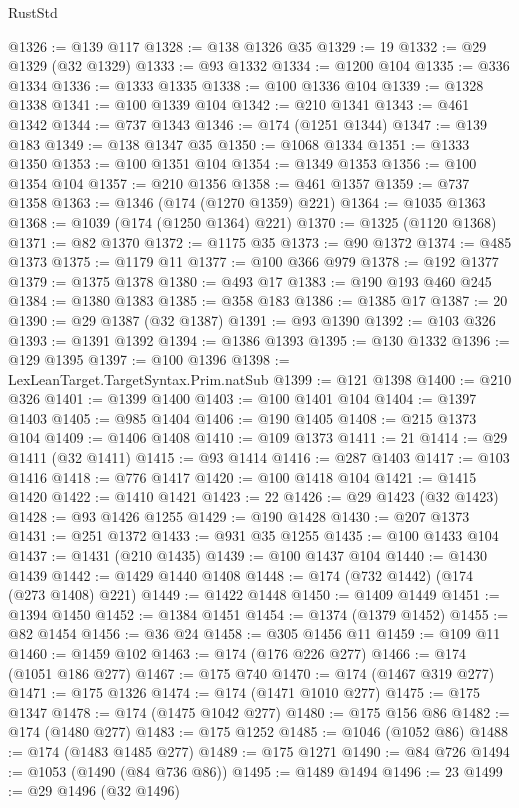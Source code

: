 \begin{lexlean}{RustStd}
\begin{coremodule}
@1326 := @139 @117
@1328 := @138 @1326 @35
@1329 := 19
@1332 := @29 @1329 (@32 @1329)
@1333 := @93 @1332
@1334 := @1200 @104
@1335 := @336 @1334
@1336 := @1333 @1335
@1338 := @100 @1336 @104
@1339 := @1328 @1338
@1341 := @100 @1339 @104
@1342 := @210 @1341
@1343 := @461 @1342
@1344 := @737 @1343
@1346 := @174 (@1251 @1344)
@1347 := @139 @183
@1349 := @138 @1347 @35
@1350 := @1068 @1334
@1351 := @1333 @1350
@1353 := @100 @1351 @104
@1354 := @1349 @1353
@1356 := @100 @1354 @104
@1357 := @210 @1356
@1358 := @461 @1357
@1359 := @737 @1358
@1363 := @1346 (@174 (@1270 @1359) @221)
@1364 := @1035 @1363
@1368 := @1039 (@174 (@1250 @1364) @221)
@1370 := @1325 (@1120 @1368)
@1371 := @82 @1370
@1372 := @1175 @35
@1373 := @90 @1372
@1374 := @485 @1373
@1375 := @1179 @11
@1377 := @100 @366 @979
@1378 := @192 @1377
@1379 := @1375 @1378
@1380 := @493 @17
@1383 := @190 @193 @460 @245
@1384 := @1380 @1383
@1385 := @358 @183
@1386 := @1385 @17
@1387 := 20
@1390 := @29 @1387 (@32 @1387)
@1391 := @93 @1390
@1392 := @103 @326
@1393 := @1391 @1392
@1394 := @1386 @1393
@1395 := @130 @1332
@1396 := @129 @1395
@1397 := @100 @1396
@1398 := LexLeanTarget.TargetSyntax.Prim.natSub
@1399 := @121 @1398
@1400 := @210 @326
@1401 := @1399 @1400
@1403 := @100 @1401 @104
@1404 := @1397 @1403
@1405 := @985 @1404
@1406 := @190 @1405
@1408 := @215 @1373 @104
@1409 := @1406 @1408
@1410 := @109 @1373
@1411 := 21
@1414 := @29 @1411 (@32 @1411)
@1415 := @93 @1414
@1416 := @287 @1403
@1417 := @103 @1416
@1418 := @776 @1417
@1420 := @100 @1418 @104
@1421 := @1415 @1420
@1422 := @1410 @1421
@1423 := 22
@1426 := @29 @1423 (@32 @1423)
@1428 := @93 @1426 @1255
@1429 := @190 @1428
@1430 := @207 @1373
@1431 := @251 @1372
@1433 := @931 @35 @1255
@1435 := @100 @1433 @104
@1437 := @1431 (@210 @1435)
@1439 := @100 @1437 @104
@1440 := @1430 @1439
@1442 := @1429 @1440 @1408
@1448 := @174 (@732 @1442) (@174 (@273 @1408) @221)
@1449 := @1422 @1448
@1450 := @1409 @1449
@1451 := @1394 @1450
@1452 := @1384 @1451
@1454 := @1374 (@1379 @1452)
@1455 := @82 @1454
@1456 := @36 @24
@1458 := @305 @1456 @11
@1459 := @109 @11
@1460 := @1459 @102
@1463 := @174 (@176 @226 @277)
@1466 := @174 (@1051 @186 @277)
@1467 := @175 @740
@1470 := @174 (@1467 @319 @277)
@1471 := @175 @1326
@1474 := @174 (@1471 @1010 @277)
@1475 := @175 @1347
@1478 := @174 (@1475 @1042 @277)
@1480 := @175 @156 @86
@1482 := @174 (@1480 @277)
@1483 := @175 @1252
@1485 := @1046 (@1052 @86)
@1488 := @174 (@1483 @1485 @277)
@1489 := @175 @1271
@1490 := @84 @726
@1494 := @1053 (@1490 (@84 @736 @86))
@1495 := @1489 @1494
@1496 := 23
@1499 := @29 @1496 (@32 @1496)

\end{coremodule}
\end{lexlean}
